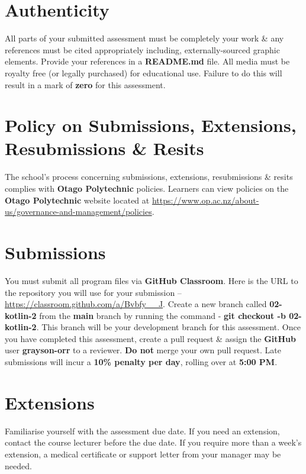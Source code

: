 \documentclass{article}
\begin{document}
\section*{Authenticity}
All parts of your submitted assessment must be completely your work \& any references must be cited appropriately including, externally-sourced graphic elements. Provide your references in a \textbf{README.md} file. All media must be royalty free (or legally purchased) for educational use. Failure to do this will result in a mark of \textbf{zero} for this assessment.

\section*{Policy on Submissions, Extensions, Resubmissions \& Resits}
The school's process concerning submissions, extensions, resubmissions \& resits complies with \textbf{Otago Polytechnic} policies. Learners can view policies on the \textbf{Otago Polytechnic} website located at \href{https://www.op.ac.nz/about-us/governance-and-management/policies}{https://www.op.ac.nz/about-us/governance-and-management/policies}.

\section*{Submissions}
You must submit all program files via \textbf{GitHub Classroom}. Here is the URL to the repository you will use for your submission – \href{https://classroom.github.com/a/Bvbfy\_\_J}{https://classroom.github.com/a/Bvbfy\_\_J}. Create a new branch called  \textbf{02-kotlin-2} from the \textbf{main} branch by running the command - \textbf{git checkout -b 02-kotlin-2}. This branch will be your development branch for this assessment. Once you have completed this assessment, create a pull request \& assign the \textbf{GitHub} user \textbf{grayson-orr} to a reviewer. \textbf{Do not} merge your own pull request. Late submissions will incur a \textbf{10\% penalty per day}, rolling over at \textbf{5:00 PM}.

\section*{Extensions}
Familiarise yourself with the assessment due date. If you need an extension, contact the course lecturer before the due date. If you require more than a week's extension, a medical certificate or support letter from your manager may be needed.
\end{document}
